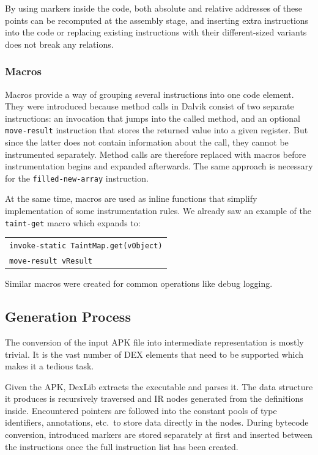 \documentclass[12pt,twoside,notitlepage]{report}
\newcommand{\centerbox}[1] {
	\begin{center}
	\begin{footnotesize}
	\begin{tabular}{l}
	#1
	\end{tabular}
	\end{footnotesize}
	\end{center}
}
\newcommand{\asm}[1] {\texttt{#1}}
\begin{document}
By using markers inside the code, both absolute and relative addresses of these points can be recomputed at the assembly stage, and inserting extra instructions into the code or replacing existing instructions with their different-sized variants does not break any relations.

\subsubsection{Macros}
\label{section:Code_Macros}

Macros provide a way of grouping several instructions into one code element. They were introduced because method calls in Dalvik consist of two separate instructions: an invocation that jumps into the called method, and an optional \verb$move-result$ instruction that stores the returned value into a given register. But since the latter does not contain information about the call, they cannot be instrumented separately. Method calls are therefore replaced with macros before instrumentation begins and expanded afterwards. The same approach is necessary for the \verb$filled-new-array$ instruction.

At the same time, macros are used as inline functions that simplify implementation of some instrumentation rules. We already saw an example of the \verb$taint-get$ macro which expands to:
	\centerbox{
		\asm{invoke-static TaintMap.get(vObject)} \\
		\asm{move-result vResult}
	}
Similar macros were created for common operations like debug logging.

\subsection{Generation Process}

The conversion of the input APK file into intermediate representation is mostly trivial. It is the vast number of DEX elements that need to be supported which makes it a tedious task. 

Given the APK, DexLib extracts the executable and parses it. The data structure it produces is recursively traversed and IR nodes generated from the definitions inside. Encountered pointers are followed into the constant pools of type identifiers, annotations, etc.\ to store data directly in the nodes. During bytecode conversion, introduced markers are stored separately at first and inserted between the instructions once the full instruction list has been created.
\end{document}

